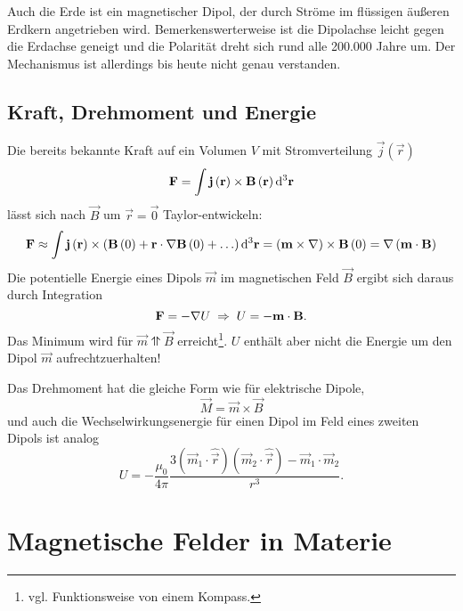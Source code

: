 Auch die Erde ist ein magnetischer Dipol, der durch Ströme im flüssigen äußeren Erdkern angetrieben wird. Bemerkenswerterweise ist die Dipolachse leicht gegen die Erdachse geneigt und die Polarität dreht sich rund alle 200.000 Jahre um. Der Mechanismus ist allerdings bis heute nicht genau verstanden.

\subsection{Kraft, Drehmoment und Energie}

Die bereits bekannte Kraft auf ein Volumen $V$ mit Stromverteilung $\vec {j}\left(\vec {r}\right)$
\begin{equation*}
	\vec {F}=\int \vec {j}\left(\vec {r}\right)\times \vec {B}\left(\vec {r}\right)\diffa[3]{\vec{r}}
\end{equation*}
lässt sich nach $\vec {B}$ um $\vec {r}=\vec {0}$ Taylor-entwickeln:
\begin{equation*}
	\vec {F}\approx \int \vec {j}\left(\vec {r}\right)\times \left(\vec {B}\left(0\right)+\vec {r}\cdot \nabla \vec {B}\left(0\right)+\ldots \right)\diffa[3]{\vec{r}}=\left(\vec {m}\times \nabla \right)\times \vec {B}\left(0\right)=\nabla \left(\vec {m}\cdot \vec {B}\right)
\end{equation*}
Die potentielle Energie eines Dipols $\vec {m}$ im magnetischen Feld $\vec {B}$ ergibt sich daraus durch Integration
\begin{equation*}
	\vec F=-\nabla U\implication U=-\vec {m}\cdot \vec {B}.
\end{equation*}
Das Minimum wird für $\vec {m} \upupharpoons \vec {B}$ erreicht\footnote{vgl. Funktionsweise von einem Kompass. }. $U$ enthält aber nicht die Energie um den Dipol $\vec {m}$ aufrechtzuerhalten!

Das Drehmoment hat die gleiche Form wie für elektrische Dipole,
\begin{equation*}
	\vec {M}=\vec {m}\times \vec {B}
\end{equation*}
und auch die Wechselwirkungsenergie für einen Dipol im Feld eines zweiten Dipols ist analog
\begin{equation*}
	U=-\frac{\mu _{0}}{4\pi }\frac{3\left(\vec {m}_{1}\cdot \hat{\vec {r}}\right)\left(\vec {m}_{2}\cdot \hat{\vec {r}}\right)-\vec {m}_{1}\cdot \vec {m}_{2}}{r^{3}}.
\end{equation*}



\section{Magnetische Felder in Materie}

